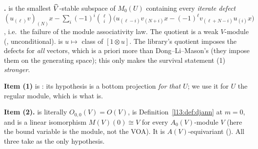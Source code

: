 \begin{dictionary}
\textbf{.}  is the smallest $\widehat{V}$-stable subspace of $M_0(U)$
containing every \emph{iterate defect}
$(u_{(\ell)}v)_{(N)}x - \sum_i(-1)^i\binom\ell i\bigl(u_{(\ell-i)}v_{(N+i)}x - (-1)^\ell v_{(\ell+N-i)}u_{(i)}x\bigr)$, i.e.\ the
failure of the module associativity law. The quotient is a weak $V$-module (, unconditional).
 is $u\mapsto$ class of $[1\otimes u]$. The library's quotient imposes the defects for \emph{all} vectors, which
is a priori more than Dong--Li--Mason's (they impose them on the generating space); this only makes the survival statement
(1) \emph{stronger}.

\textbf{Item (1)} is : its hypothesis is a bottom projection \emph{for that
$U$}; we use it for $U$ the regular module, which is what  is.

\textbf{Item (2).}  is literally $O_{0,0}(V) = O(V)$,  is
Definition~\ref{l13:def:djann} at $m = 0$, and  is a linear isomorphism
$M(V)(0)\cong V$ for every $A_0(V)$-module $V$ (here the bound variable  is the module, not the VOA). It is $A(V)$-equivariant
(). All three take  as the only hypothesis.
\end{dictionary}

